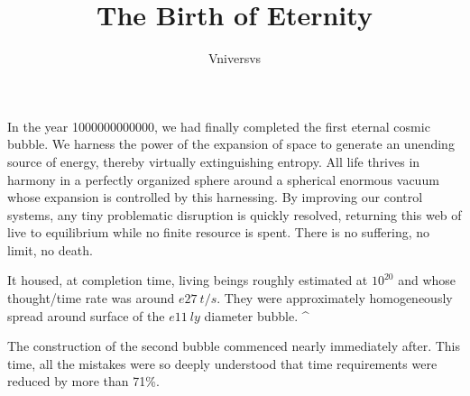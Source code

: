 \documentclass[]{article}
\title{The Birth of Eternity}
\author{Vniversvs}
\begin{document}
\maketitle

\begin{abstract}

\end{abstract}

\section{}

In the year 1000000000000, we had finally completed the first eternal cosmic bubble. We harness the power of the expansion of space to generate an unending source of energy, thereby virtually extinguishing entropy. All life thrives in harmony in a perfectly organized sphere around a spherical enormous vacuum whose expansion is controlled by this harnessing. By improving our control systems, any tiny problematic disruption is quickly resolved, returning this web of live to equilibrium while no finite resource is spent. There is no suffering, no limit, no death.

It housed, at completion time, living beings roughly estimated at $10^{20}$ and whose thought/time rate was around $e27 \ t/s$. They were approximately homogeneously spread around surface of the $e11 \ ly$ diameter bubble. ^

The construction of the second bubble commenced nearly immediately after. This time, all the mistakes were so deeply understood that time requirements were reduced by more than 71\%.
\end{document}
